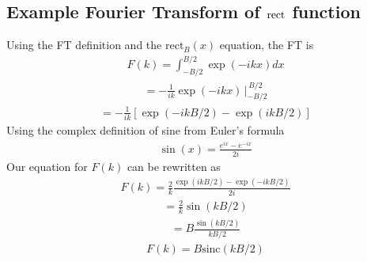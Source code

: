 \documentclass[letterpaper,10pt,english]{jupyterBook}
\begin{document}
\subsection{Example Fourier Transform of \protect\(\text{rect}\protect\) function}
\label{\detokenize{fFy:example-fourier-transform-of-text-rect-function}}
\sphinxAtStartPar
Using the FT definition and the \(\text{rect}_B(x)\) equation, the FT is
\begin{equation*}
\begin{split}
F(k) = \int_{-B/2}^{B/2} \exp(-ikx)dx
\end{split}
\end{equation*}\begin{equation*}
\begin{split}
= -\frac{1}{ik} \exp(-ikx) \, \Big|_{-B/2}^{\,B/2}
\end{split}
\end{equation*}\begin{equation*}
\begin{split}
= -\frac{1}{ik} \left[ \exp(-ikB/2) - \exp(ikB/2)\right]
\end{split}
\end{equation*}
\sphinxAtStartPar
Using the complex definition of sine from Euler’s formula
\begin{equation*}
\begin{split}
\sin(x) = \frac{e^{ix} - e^{-ix}}{2i}
\end{split}
\end{equation*}
\sphinxAtStartPar
Our equation for \(F(k)\) can be re\sphinxhyphen{}written as
\begin{equation*}
\begin{split}
F(k) = \frac{2}{k}\frac{\exp(ikB/2) - \exp(-ikB/2)}{2i}
\end{split}
\end{equation*}\begin{equation*}
\begin{split}
= \frac{2}{k} \sin(kB/2)
\end{split}
\end{equation*}\begin{equation*}
\begin{split}
= B \frac{\sin(kB/2)}{kB/2}
\end{split}
\end{equation*}\begin{equation*}
\begin{split}
F(k) = B \text{sinc}(kB/2)
\end{split}
\end{equation*}
\end{document}
